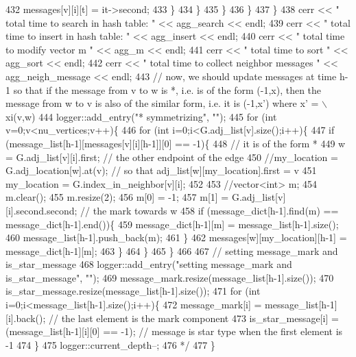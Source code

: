 \begin{DoxyCode}
432 \textcolor{comment}{            messages[v][i][t] = it->second;}
433 \textcolor{comment}{          \}}
434 \textcolor{comment}{        \}}
435 \textcolor{comment}{      \}}
436 \textcolor{comment}{    \}}
437 \textcolor{comment}{  \}}
438 \textcolor{comment}{  cerr << " total time to search in hash table: " << agg\_search << endl;}
439 \textcolor{comment}{  cerr << " total time to insert in hash table: " << agg\_insert << endl;}
440 \textcolor{comment}{  cerr << " total time to modify vector m  " << agg\_m << endl;}
441 \textcolor{comment}{  cerr << " total time to sort  " << agg\_sort << endl;}
442 \textcolor{comment}{  cerr << " total time to collect neighbor messages " <<  agg\_neigh\_message << endl;}
443 \textcolor{comment}{  // now, we should update messages at time h-1 so that if the message from v to w is *, i.e. is of the
       form (-1,x), then the message from w to v is also of the similar form, i.e. it is (-1,x') where x' = \(\backslash\)xi(v,w)}
444 \textcolor{comment}{  logger::add\_entry("* symmetrizing", "");}
445 \textcolor{comment}{  for (int v=0;v<nu\_vertices;v++)\{}
446 \textcolor{comment}{    for (int i=0;i<G.adj\_list[v].size();i++)\{}
447 \textcolor{comment}{      if (message\_list[h-1][messages[v][i][h-1]][0] == -1)\{}
448 \textcolor{comment}{        // it is of the form *}
449 \textcolor{comment}{        w = G.adj\_list[v][i].first; // the other endpoint of the edge}
450 \textcolor{comment}{        //my\_location = G.adj\_location[w].at(v); // so that adj\_list[w][my\_location].first = v}
451 \textcolor{comment}{        my\_location = G.index\_in\_neighbor[v][i];}
452 \textcolor{comment}{}
453 \textcolor{comment}{        //vector<int> m;}
454 \textcolor{comment}{        m.clear();}
455 \textcolor{comment}{        m.resize(2);}
456 \textcolor{comment}{        m[0] = -1;}
457 \textcolor{comment}{        m[1] = G.adj\_list[v][i].second.second; // the mark towards w}
458 \textcolor{comment}{        if (message\_dict[h-1].find(m) == message\_dict[h-1].end())\{}
459 \textcolor{comment}{          message\_dict[h-1][m] = message\_list[h-1].size();}
460 \textcolor{comment}{          message\_list[h-1].push\_back(m);}
461 \textcolor{comment}{        \}}
462 \textcolor{comment}{        messages[w][my\_location][h-1] = message\_dict[h-1][m];}
463 \textcolor{comment}{      \}}
464 \textcolor{comment}{    \}}
465 \textcolor{comment}{  \}}
466 \textcolor{comment}{}
467 \textcolor{comment}{  // setting message\_mark and is\_star\_message}
468 \textcolor{comment}{  logger::add\_entry("setting message\_mark and is\_star\_message", "");}
469 \textcolor{comment}{  message\_mark.resize(message\_list[h-1].size());}
470 \textcolor{comment}{  is\_star\_message.resize(message\_list[h-1].size());}
471 \textcolor{comment}{  for (int i=0;i<message\_list[h-1].size();i++)\{}
472 \textcolor{comment}{    message\_mark[i] = message\_list[h-1][i].back(); // the last element is the mark component}
473 \textcolor{comment}{    is\_star\_message[i] = (message\_list[h-1][i][0] == -1); // message is star type when the first element is
       -1}
474 \textcolor{comment}{  \}}
475 \textcolor{comment}{  logger::current\_depth--;}
476 \textcolor{comment}{  */}
477 \}
\end{DoxyCode}


